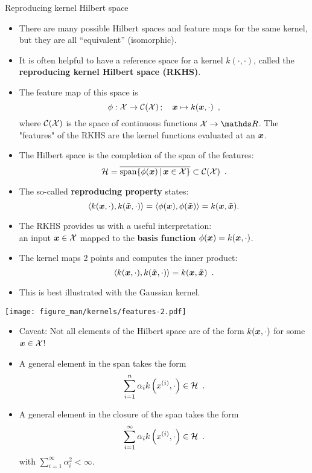 \begin{vbframe}{Reproducing kernel Hilbert space}

  \begin{itemize}
    \item There are many possible Hilbert spaces and feature maps for
    the same kernel, but they are all ``equivalent'' (isomorphic).
    \item It is often helpful to have a reference space for a kernel $k(\cdot,\cdot)$, called the \textbf{reproducing kernel Hilbert space (RKHS)}. 
    \item The feature map of this space is
    $$
      \phi : \mathcal{X} \to \mathcal{C}(\mathcal{X}) \,;\quad \bm{x} \mapsto k(\bm{x}, \cdot)
      \enspace,
    $$
    where $\mathcal{C}(\mathcal{X})$ is the space of continuous functions
    $\Xspace \to \R$. The "features" of the RKHS are the kernel functions evaluated at an $\bm{x}$. 
    \item The Hilbert space is the completion of the span of the features:
    $$
      \mathcal{H} = \overline{\operatorname{span}\{\phi(\bm{x}) \,|\, \bm{x} \in \mathcal{X} \}} \subset \mathcal{C}(\mathcal{X})
      \enspace.
    $$
\item The so-called \textbf{reproducing property} states: 
$$
  \left\langle k(\bm{x}, \cdot), k(\bm{\tilde{x}}, \cdot) \right\rangle = \left\langle \phi(\bm{x}), \phi(\bm{\tilde{x}}) \right\rangle = k(\bm{x}, \bm{\tilde{x}}).
$$
  \end{itemize}

\framebreak

  \begin{itemize}
    \item The RKHS provides us with a useful interpretation:\\
    an input $\bm{x} \in \mathcal{X}$ mapped to the \textbf{basis function}
    $\phi(\bm{x}) = k(\bm{x}, \cdot)$.
    \item The kernel maps 2 points and computes the inner product:
    $$
      \langle k(\bm{x}, \cdot), k( \tilde {\bm{x}}, \cdot) \rangle = k(\bm{x}, \tilde {\bm{x}})
      \enspace.
    $$
    \item This is best illustrated with the Gaussian kernel.


  \end{itemize}

\begin{center}
    \texttt{[image: figure\_man/kernels/features-2.pdf]}
\end{center}

\framebreak

  \begin{itemize}
    \item Caveat: Not all elements of the Hilbert space are of the
    form $k(\bm{x}, \cdot)$ for some $\bm{x} \in \mathcal{X}$!
    \item A general element in the span takes the form
    $$
    \sum_{i=1}^n \alpha_i k\left(x^{(i)}, \cdot\right) \in \mathcal{H}
    \enspace.
    $$
    \item A general element in the closure of the span takes the form
    $$
    \sum_{i=1}^\infty \alpha_i k\left(x^{(i)}, \cdot\right) \in \mathcal{H}
    \enspace.
    $$
    with $\sum_{i=1}^\infty \alpha_i^2 < \infty$.
  \end{itemize}


\end{vbframe}

